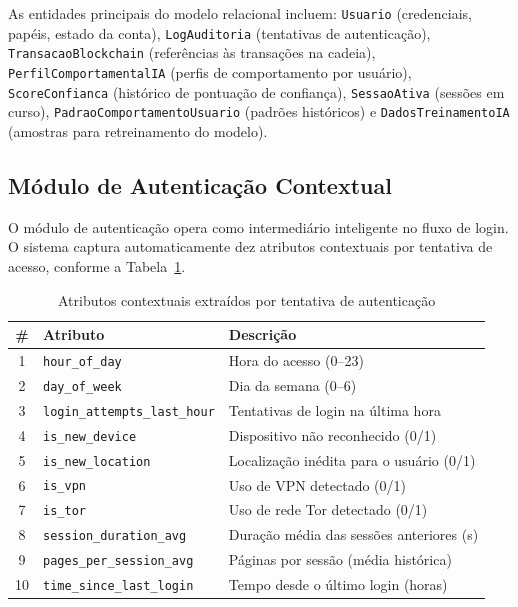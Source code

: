 \documentclass[12pt]{article}
\begin{document}
As entidades principais do modelo relacional incluem: \texttt{Usuario} (credenciais, papéis, estado da conta), \texttt{LogAuditoria} (tentativas de autenticação), \texttt{TransacaoBlockchain} (referências às transações na cadeia), \texttt{PerfilComportamentalIA} (perfis de comportamento por usuário), \texttt{ScoreConfianca} (histórico de pontuação de confiança), \texttt{SessaoAtiva} (sessões em curso), \texttt{PadraoComportamentoUsuario} (padrões históricos) e \texttt{DadosTreinamentoIA} (amostras para retreinamento do modelo).

\subsection{Módulo de Autenticação Contextual}

O módulo de autenticação opera como intermediário inteligente no fluxo de login. O sistema captura automaticamente dez atributos contextuais por tentativa de acesso, conforme a Tabela~\ref{tab:features}.

\begin{table}[H]
\centering
\caption{Atributos contextuais extraídos por tentativa de autenticação}
\label{tab:features}
\small
\begin{tabular}{@{}clp{7cm}@{}}
\toprule
\textbf{\#} & \textbf{Atributo} & \textbf{Descrição} \\
\midrule
1  & \texttt{hour\_of\_day}              & Hora do acesso (0--23) \\
2  & \texttt{day\_of\_week}              & Dia da semana (0--6) \\
3  & \texttt{login\_attempts\_last\_hour} & Tentativas de login na última hora \\
4  & \texttt{is\_new\_device}            & Dispositivo não reconhecido (0/1) \\
5  & \texttt{is\_new\_location}          & Localização inédita para o usuário (0/1) \\
6  & \texttt{is\_vpn}                    & Uso de VPN detectado (0/1) \\
7  & \texttt{is\_tor}                    & Uso de rede Tor detectado (0/1) \\
8  & \texttt{session\_duration\_avg}     & Duração média das sessões anteriores (s) \\
9  & \texttt{pages\_per\_session\_avg}   & Páginas por sessão (média histórica) \\
10 & \texttt{time\_since\_last\_login}   & Tempo desde o último login (horas) \\
\bottomrule
\end{tabular}
\end{table}
\end{document}
